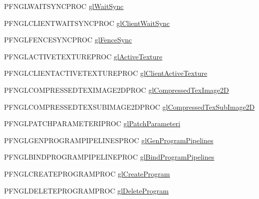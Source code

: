 \begin{DoxyCompactItemize}
\item 
P\+F\+N\+G\+L\+W\+A\+I\+T\+S\+Y\+N\+C\+P\+R\+O\+C \hyperlink{class_agmd_1_1_g_l_context_a02f15f63c70d68b8c2e997ee2901e513}{gl\+Wait\+Sync}
\item 
P\+F\+N\+G\+L\+C\+L\+I\+E\+N\+T\+W\+A\+I\+T\+S\+Y\+N\+C\+P\+R\+O\+C \hyperlink{class_agmd_1_1_g_l_context_a12a61d9ff7ec4f7eeef9a8987150f1dd}{gl\+Client\+Wait\+Sync}
\item 
P\+F\+N\+G\+L\+F\+E\+N\+C\+E\+S\+Y\+N\+C\+P\+R\+O\+C \hyperlink{class_agmd_1_1_g_l_context_a661a1e25e420485fc816072408c27b05}{gl\+Fence\+Sync}
\item 
P\+F\+N\+G\+L\+A\+C\+T\+I\+V\+E\+T\+E\+X\+T\+U\+R\+E\+P\+R\+O\+C \hyperlink{class_agmd_1_1_g_l_context_a2372ee006b9d80b06f79b8068d2a8e2f}{gl\+Active\+Texture}
\item 
P\+F\+N\+G\+L\+C\+L\+I\+E\+N\+T\+A\+C\+T\+I\+V\+E\+T\+E\+X\+T\+U\+R\+E\+P\+R\+O\+C \hyperlink{class_agmd_1_1_g_l_context_aa527874cd6a8e290bcb88c6f532fd1f5}{gl\+Client\+Active\+Texture}
\item 
P\+F\+N\+G\+L\+C\+O\+M\+P\+R\+E\+S\+S\+E\+D\+T\+E\+X\+I\+M\+A\+G\+E2\+D\+P\+R\+O\+C \hyperlink{class_agmd_1_1_g_l_context_a8b4bc4134595e93ae8131425292ca6fa}{gl\+Compressed\+Tex\+Image2\+D}
\item 
P\+F\+N\+G\+L\+C\+O\+M\+P\+R\+E\+S\+S\+E\+D\+T\+E\+X\+S\+U\+B\+I\+M\+A\+G\+E2\+D\+P\+R\+O\+C \hyperlink{class_agmd_1_1_g_l_context_a3ec200694b84391a0b1ddd03c3605a83}{gl\+Compressed\+Tex\+Sub\+Image2\+D}
\item 
P\+F\+N\+G\+L\+P\+A\+T\+C\+H\+P\+A\+R\+A\+M\+E\+T\+E\+R\+I\+P\+R\+O\+C \hyperlink{class_agmd_1_1_g_l_context_a30444292676fd9e8559d52071606bd1f}{gl\+Patch\+Parameteri}
\item 
P\+F\+N\+G\+L\+G\+E\+N\+P\+R\+O\+G\+R\+A\+M\+P\+I\+P\+E\+L\+I\+N\+E\+S\+P\+R\+O\+C \hyperlink{class_agmd_1_1_g_l_context_a5e4f343b3533cfe208ef8491fb285d24}{gl\+Gen\+Program\+Pipelines}
\item 
P\+F\+N\+G\+L\+B\+I\+N\+D\+P\+R\+O\+G\+R\+A\+M\+P\+I\+P\+E\+L\+I\+N\+E\+P\+R\+O\+C \hyperlink{class_agmd_1_1_g_l_context_a4e4d5b096237954406bd48327493661e}{gl\+Bind\+Program\+Pipelines}
\item 
P\+F\+N\+G\+L\+C\+R\+E\+A\+T\+E\+P\+R\+O\+G\+R\+A\+M\+P\+R\+O\+C \hyperlink{class_agmd_1_1_g_l_context_adf5297770e9eef973cf028039c6ed910}{gl\+Create\+Program}
\item 
P\+F\+N\+G\+L\+D\+E\+L\+E\+T\+E\+P\+R\+O\+G\+R\+A\+M\+P\+R\+O\+C \hyperlink{class_agmd_1_1_g_l_context_aa880219cce3a71704c3fc76ec9643162}{gl\+Delete\+Program}

\end{DoxyCompactItemize}

